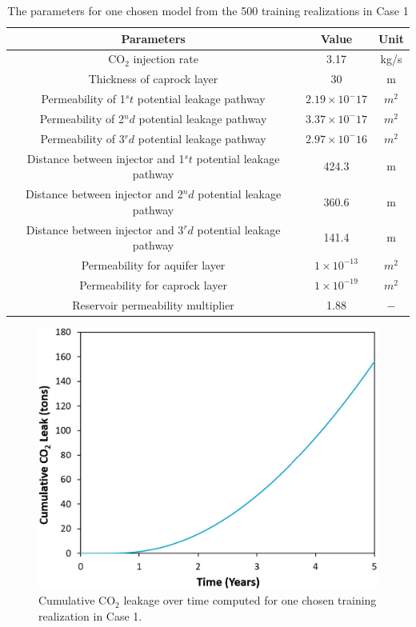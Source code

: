 \documentclass[10pt, twoside]{article}
\begin{document}
\begin{table}
\caption{The parameters for one chosen model from the 500 training realizations in Case 1}
\label{tbl:2}
\begin{center}
\begin{tabular}{ |c|c|c| } \hline
\textbf{Parameters} & \textbf{Value} & \textbf{Unit} \\\hline \hline
CO$_2$ injection rate & 3.17 & kg/s \\ \hline
Thickness of caprock layer & 30 & m \\ \hline
Permeability of 1$^st$ potential leakage pathway & $2.19\times 10^-{17}$ & $m^2$ \\ \hline
Permeability of 2$^nd$ potential leakage pathway & $3.37\times 10^-{17}$ & $m^2$ \\ \hline
Permeability of 3$^rd$ potential leakage pathway & $2.97\times 10^-{16}$ & $m^2$ \\ \hline
Distance between injector and 1$^st$ potential leakage pathway & 424.3 & m \\ \hline
Distance between injector and 2$^nd$ potential leakage pathway & 360.6 & m \\ \hline
Distance between injector and 3$^rd$ potential leakage pathway & 141.4 & m \\ \hline
Permeability for aquifer layer & $1\times 10^{-13}$ & $m^2$ \\ \hline
Permeability for caprock layer & $1\times 10^{-19}$ & $m^2$  \\ \hline
Reservoir permeability multiplier & 1.88 & $-$ \\ \hline
\end{tabular}
\end{center}
\end{table}

\begin{figure} [H]
\centering
\includegraphics[width=7.5 cm]{Figure 8.jpg}
\caption{Cumulative CO$_2$ leakage over time computed for one chosen training realization in Case 1.}
\label{cum_leak_line}
\end{figure}
\end{document}
